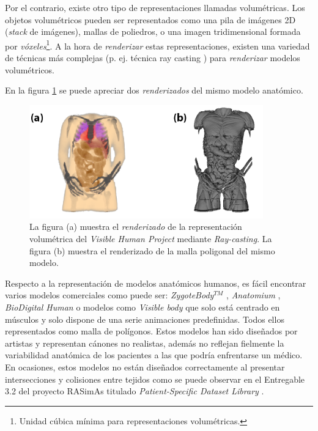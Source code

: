 Por el contrario, 
existe otro tipo de representaciones  llamadas volumétricas. Los objetos volumétricos pueden ser representados como una pila de imágenes 2D (\emph{stack} de imágenes), mallas de poliedros, o una imagen  tridimensional formada por \emph{vóxeles}\footnote{Unidad cúbica mínima para representaciones volumétricas.}. A la hora de \emph{renderizar} estas representaciones, existen una variedad de técnicas más complejas (p. ej. técnica ray casting \cite{isabel}) para \emph{renderizar} modelos volumétricos.


En la figura \ref{fig:HVP} se puede apreciar dos \emph{renderizados} del mismo modelo anatómico.

\begin{figure}[ht]
   \centering
    \includegraphics[width=0.9\textwidth]{IMG/volvsb-rep.png}
    \caption{La figura (a) muestra el \emph{renderizado} de la representación volumétrica del \emph{Visible Human Project} \cite{ackerman1998visible} mediante \emph{Ray-casting}. La figura (b) muestra el renderizado de la malla poligonal del mismo modelo. }
   \label{fig:HVP}
\end{figure}



Respecto a la representación de modelos anatómicos humanos, es fácil encontrar  varios modelos comerciales como puede ser: \emph{ZygoteBody}$^{TM}$ \cite{kelc2012zygote}, \emph{Anatomium} \cite{Anatomium}, \emph{BioDigital Human} \cite{qualter2012biodigital} o modelos como \emph{Visible body} \cite{visible2012visible} que solo está centrado en músculos y solo dispone de una serie animaciones predefinidas. Todos ellos representados como malla de polígonos. Estos modelos han sido diseñados por artistas y representan cánones no realistas, además no reflejan fielmente la variabilidad anatómica de los pacientes a las que podría enfrentarse un médico. En ocasiones, estos modelos no están diseñados correctamente al presentar intersecciones y colisiones entre tejidos como se puede observar en el Entregable 3.2 del proyecto \ac{RASimAs} titulado \emph{Patient-Specific Dataset Library} \cite{ded3.2}.

